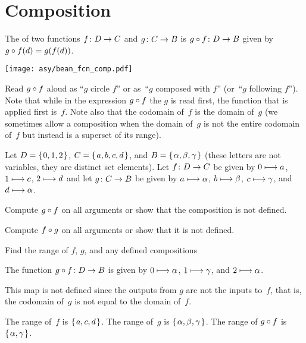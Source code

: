 \documentclass{ibl}  %
\begin{document}
\section{Composition}

\begin{df}
The  of
two functions
$\mbox{$f\colon D\to C$}$ and $\mbox{$g\colon C\to B$}$ 
is $\mbox{$g\mathbin{\circ} f\colon D\to B$}$ given by 
$g\mathbin{\circ} f(d)=g(f(d))$.
\end{df}

\begin{center}
  \texttt{[image: asy/bean\_fcn\_comp.pdf]}  
\end{center}

Read $g\mathbin{\circ} f$ aloud as ``$g$ circle $f$'' 
or as~``$g$ composed with $f$''
(or~``$g$ following $f$'').
Note that while
in the expression $g\mathbin{\circ} f$ the $g$ is read first,
the function that is applied first is~$f$. 
Note also that the codomain of~$f$ is the domain of~$g$
(we sometimes 
allow a composition when the domain of~$g$ is not the 
entire codomain of~$f$ but instead is a superset of its range).


\begin{problem} Let $D=\mbox{$\{\hspace{0.1em}0,1,2\hspace{0.1em}\}$}$, $C=\mbox{$\{\hspace{0.1em}a,b,c,d\hspace{0.1em}\}$}$, 
and $B=\mbox{$\{\hspace{0.1em}\alpha,\beta,\gamma\hspace{0.1em}\}$}$ (these letters are not variables, they are
distinct set elements).
Let $\mbox{$f\colon D\to C$}$ be given by $0\stackrel{}{\longmapsto} a$, $1\stackrel{}{\longmapsto} c$, 
$2\stackrel{}{\longmapsto} d$ and let $\mbox{$g\colon C\to B$}$
be given by 
$a\stackrel{}{\longmapsto}\alpha$, $b\stackrel{}{\longmapsto} \beta$, $c\stackrel{}{\longmapsto}\gamma$,
and $d\stackrel{}{\longmapsto}\alpha$.
\begin{items}
\item Compute $g\mathbin{\circ} f$ on all arguments or show that the composition
  is not defined.
\item Compute $f\mathbin{\circ} g$ on all arguments or show that it is not defined.
\item Find the range of $f$, $g$, and any defined compositions    
\end{items}
\begin{answer}
\begin{items}
\item The function $\mbox{$g\mathbin{\circ} f\colon D\to B$}$ is given by 
  $0\stackrel{}{\longmapsto}\alpha$, $1\stackrel{}{\longmapsto}\gamma$, and $2\stackrel{}{\longmapsto}\alpha$.
\item This map is not defined since the outputs from $g$ are not the inputs
  to~$f$, that is, the codomain of~$g$ is not equal to 
  the domain of~$f$.
\item The range of~$f$ is $\mbox{$\{\hspace{0.1em}a,c,d\hspace{0.1em}\}$}$.
  The range of~$g$ is $\mbox{$\{\hspace{0.1em}\alpha,\beta,\gamma\hspace{0.1em}\}$}$. 
  The range of $g\mathbin{\circ} f$ is $\mbox{$\{\hspace{0.1em}\alpha,\gamma\hspace{0.1em}\}$}$.
\end{items}
\end{answer}
\end{problem}
\end{document}
